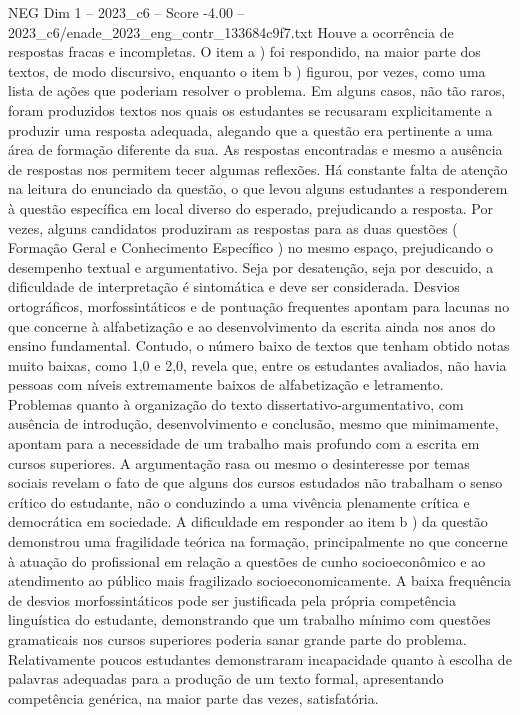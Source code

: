 \begin{textsample}{NEG Dim 1 – 2023\_c6 – Score -4.00 – 2023\_c6/enade\_2023\_eng\_contr\_133684c9f7.txt}
Houve a ocorrência de respostas fracas e incompletas.
O item a ) foi respondido, na maior parte dos textos, de modo discursivo, enquanto o item b ) figurou, por vezes, como uma lista de ações que poderiam resolver o problema.
Em alguns casos, não tão raros, foram produzidos textos nos quais os estudantes se recusaram explicitamente a produzir uma resposta adequada, alegando que a questão era pertinente a uma área de formação diferente da sua.
As respostas encontradas e mesmo a ausência de respostas nos permitem tecer algumas reflexões.
Há constante falta de atenção na leitura do enunciado da questão, o que levou alguns estudantes a responderem à questão específica em local diverso do esperado, prejudicando a resposta.
Por vezes, alguns candidatos produziram as respostas para as duas questões ( Formação Geral e Conhecimento Específico ) no mesmo espaço, prejudicando o desempenho textual e argumentativo.
Seja por desatenção, seja por descuido, a dificuldade de interpretação é sintomática e deve ser considerada.
Desvios ortográficos, morfossintáticos e de pontuação frequentes apontam para lacunas no que concerne à alfabetização e ao desenvolvimento da escrita ainda nos anos do ensino fundamental.
Contudo, o número baixo de textos que tenham obtido notas muito baixas, como 1,0 e 2,0, revela que, entre os estudantes avaliados, não havia pessoas com níveis extremamente baixos de alfabetização e letramento.
Problemas quanto à organização do texto dissertativo-argumentativo, com ausência de introdução, desenvolvimento e conclusão, mesmo que minimamente, apontam para a necessidade de um trabalho mais profundo com a escrita em cursos superiores.
A argumentação rasa ou mesmo o desinteresse por temas sociais revelam o fato de que alguns dos cursos estudados não trabalham o senso crítico do estudante, não o conduzindo a uma vivência plenamente crítica e democrática em sociedade.
A dificuldade em responder ao item b ) da questão demonstrou uma fragilidade teórica na formação, principalmente no que concerne à atuação do profissional em relação a questões de cunho socioeconômico e ao atendimento ao público mais fragilizado socioeconomicamente.
A baixa frequência de desvios morfossintáticos pode ser justificada pela própria competência linguística do estudante, demonstrando que um trabalho mínimo com questões gramaticais nos cursos superiores poderia sanar grande parte do problema.
Relativamente poucos estudantes demonstraram incapacidade quanto à escolha de palavras adequadas para a produção de um texto formal, apresentando competência genérica, na maior parte das vezes, satisfatória.

\end{textsample}
